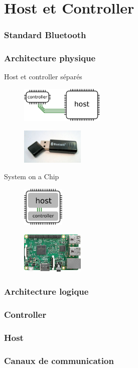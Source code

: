 \section{Host et Controller}

\begin{frame}
	\frametitle{Standard Bluetooth}
\end{frame}

\begin{frame}
	\frametitle{Architecture physique}
	\begin{block}{Host et controller séparés}
		\begin{minipage}[t]{0.48\linewidth}
		\begin{figure}
			\includegraphics[width=4cm]{img/HC_sep.png}
		\end{figure}
		\end{minipage}
		\begin{minipage}[t]{0.48\linewidth}
		\begin{figure}
			\includegraphics[width=3cm]{img/dongle.jpg}
		\end{figure}
		\end{minipage}
	\end{block}
	\begin{block}{System on a Chip}
		\begin{minipage}[t]{0.48\linewidth}
		\begin{figure}
			\includegraphics[width=2cm]{img/HC_soc.png}
		\end{figure}
		\end{minipage}
		\begin{minipage}[t]{0.48\linewidth}
		\begin{figure}
			\includegraphics[width=3cm]{img/rpi3.png}
		\end{figure}
		\end{minipage}
	\end{block}
\end{frame}


\begin{frame}
	\frametitle{Architecture logique}
\end{frame}

\begin{frame}
	\frametitle{Controller}
\end{frame}

\begin{frame}
	\frametitle{Host}
\end{frame}

\begin{frame}
	\frametitle{Canaux de communication}
\end{frame}


